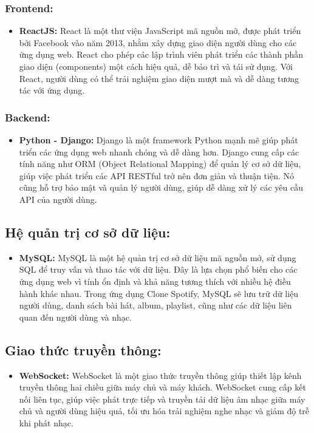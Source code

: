 \subsubsection{ Frontend:}
\begin{itemize}
    \item \textbf{ReactJS:} React là một thư viện JavaScript mã nguồn mở, được phát triển bởi Facebook vào năm 2013, nhằm xây dựng giao diện người dùng cho các ứng dụng web. React cho phép các lập trình viên phát triển các thành phần giao diện (components) một cách hiệu quả, dễ bảo trì và tái sử dụng. Với React, người dùng có thể trải nghiệm giao diện mượt mà và dễ dàng tương tác với ứng dụng.
\end{itemize}

\subsubsection{ Backend:}
\begin{itemize}
    \item \textbf{Python - Django:} Django là một framework Python mạnh mẽ giúp phát triển các ứng dụng web nhanh chóng và dễ dàng hơn. Django cung cấp các tính năng như ORM (Object Relational Mapping) để quản lý cơ sở dữ liệu, giúp việc phát triển các API RESTful trở nên đơn giản và thuận tiện. Nó cũng hỗ trợ bảo mật và quản lý người dùng, giúp dễ dàng xử lý các yêu cầu API của người dùng.
\end{itemize}

\subsection{Hệ quản trị cơ sở dữ liệu:}
\begin{itemize}
    \item \textbf{MySQL:} MySQL là một hệ quản trị cơ sở dữ liệu mã nguồn mở, sử dụng SQL để truy vấn và thao tác với dữ liệu. Đây là lựa chọn phổ biến cho các ứng dụng web vì tính ổn định và khả năng tương thích với nhiều hệ điều hành khác nhau. Trong ứng dụng Clone Spotify, MySQL sẽ lưu trữ dữ liệu người dùng, danh sách bài hát, album, playlist, cũng như các dữ liệu liên quan đến người dùng và nhạc.
\end{itemize}

\subsection{Giao thức truyền thông:}
\begin{itemize}
    \item \textbf{WebSocket:} WebSocket là một giao thức truyền thông giúp thiết lập kênh truyền thông hai chiều giữa máy chủ và máy khách. WebSocket cung cấp kết nối liên tục, giúp việc phát trực tiếp và truyền tải dữ liệu âm nhạc giữa máy chủ và người dùng hiệu quả, tối ưu hóa trải nghiệm nghe nhạc và giảm độ trễ khi phát nhạc.
\end{itemize}

